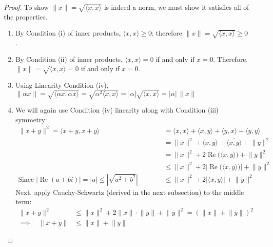 \documentclass[12pt]{article}
\numberwithin{equation}{section} %
\theoremstyle{plain}
\theoremstyle{definition}
\theoremstyle{remark}
\renewcommand{\Re}{\operatorname{Re}}
\begin{document}
\begin{proof}
To show $\lVert x \rVert =\sqrt{\langle x,x\rangle}$ is indeed a norm,
we must show it satisfies all of the properties.
\begin{enumerate}[label=(\roman*)]
  \item By Condition (i) of inner products, $\langle x,x \rangle\geq 0$;
    therefore $\lVert x\rVert = \sqrt{\langle x,x \rangle} \geq 0$.
  \item By Condition (ii) of inner products, $\langle x,x \rangle= 0$ if
    and only if $x=0$. Therefore, $\lVert x\rVert = \sqrt{\langle x,x
    \rangle} = 0$ if and only if $x=0$.
  \item Using Linearity Condition (iv),
      $\lVert \alpha x\rVert
      = \sqrt{\langle \alpha x, \alpha x\rangle}
      = \sqrt{\alpha^2\langle x, x \rangle}
      = |\alpha|\sqrt{\langle x, x \rangle}
      = |\alpha|\, \lVert x\rVert$
  \item We will again use Condition (iv) linearity along with Condition
    (iii) symmetry:
    \begin{align*}
      \lVert x+y\rVert^2
      =
      \langle x+y, x+y\rangle
      &=
      \langle x, x\rangle
      +
      \langle x, y\rangle
      +
      \langle y, x\rangle
      +
      \langle y, y\rangle
      \\
      &=
      \lVert x\rVert^2
      +
      \langle x, y\rangle
      +
      \overline{\langle x, y\rangle}
      +
      \lVert y\rVert^2
      \\
      &=
      \lVert x\rVert^2
      +
      2\Re\big( \langle x, y\rangle\big)
      +
      \lVert y\rVert^2
      \\
      &\leq
      \lVert x\rVert^2
      +
      2\left\lvert\Re\big( \langle x, y\rangle\big)\right\rvert
      +
      \lVert y\rVert^2
      \\
      \text{Since $|\Re(a+bi)|=|a| \leq \left\lvert\sqrt{a^2+b^2}\right\rvert$}\qquad\quad
      &\leq
      \lVert x\rVert^2
      +
      2\left\lvert\langle x, y\rangle\right\rvert
      +
      \lVert y\rVert^2
    \end{align*}
    Next, apply Cauchy-Schwartz (derived in the next subsection) to the
    middle term:
    \begin{align*}
      \lVert x+y\rVert^2
      &\leq
      \lVert x\rVert^2
      +
      2\lVert x\rVert\cdot\lVert y\rVert
      +
      \lVert y\rVert^2
      =
      \left(
      \lVert x\rVert
      +
      \lVert y\rVert
      \right)^2
      \\
      \implies\quad
      \lVert x+y\rVert
      &\leq
      \lVert x\rVert
      +
      \lVert y\rVert
    \end{align*}

\end{enumerate}
\end{proof}
\end{document}
